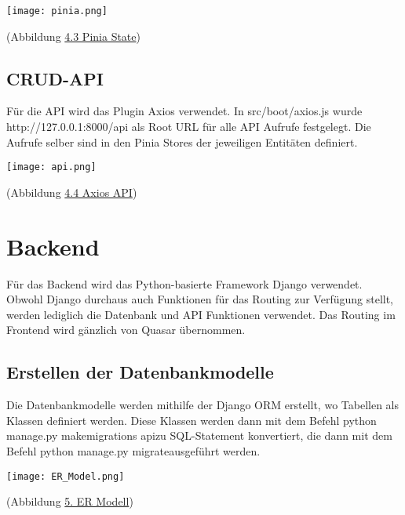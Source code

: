         \bigskip\noindent
        \begin{center}
            \texttt{[image: pinia.png]}
        \end{center}
        \begin{center}
            (Abbildung \hyperref[pinia]{4.3 Pinia State})
        \end{center}

    \subsection{CRUD-API}
        Für die API wird das Plugin Axios verwendet. In src/boot/axios.js wurde http://127.0.0.1:8000/api
        als Root URL für alle API Aufrufe festgelegt. Die Aufrufe selber sind in den Pinia Stores der jeweiligen Entitäten definiert.
        
        \bigskip\noindent
        \begin{center}
        \texttt{[image: api.png]}
        \end{center}
        \begin{center}
            (Abbildung \hyperref[api]{4.4 Axios API})
        \end{center}

\section{Backend}
    Für das Backend wird das Python-basierte Framework Django verwendet. Obwohl Django durchaus auch Funktionen für das Routing zur Verfügung stellt, werden lediglich
    die Datenbank und API Funktionen verwendet. Das Routing im Frontend wird gänzlich von Quasar übernommen.

    \subsection{Erstellen der Datenbankmodelle}
        Die Datenbankmodelle werden mithilfe der Django ORM erstellt, wo Tabellen als Klassen definiert werden. Diese Klassen werden dann mit dem Befehl
        \flqq python manage.py makemigrations api\frqq zu SQL-Statement konvertiert, die dann mit dem Befehl \flqq python manage.py migrate\frqq ausgeführt werden.

        \bigskip\noindent
        \begin{center}
        \texttt{[image: ER\_Model.png]}
        \end{center}
        \begin{center}
            (Abbildung \hyperref[erm]{5. ER Modell})
        \end{center}

